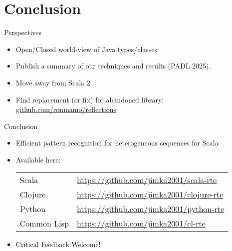 \section{Conclusion}


\begin{frame}{Perspectives}
  \begin{itemize}
  \item Open/Closed world-view of Java types/classes
  \item Publish a summary of our techniques and results (PADL 2025).
  \item Move away from Scala 2
  \item Find replacement (or fix) for abandoned library:   \url{github.com/ronmamo/reflections}
  \end{itemize}
\end{frame}

{
\begin{frame}{Conclusion}
  \begin{itemize}
  \item Efficient pattern recognition for heterogeneous sequences for Scala
  \item Available here:

    \bigskip
    
    \begin{tabular}{ll}
    Scala & \url{https://github.com/jimka2001/scala-rte}\\
    Clojure & \url{https://github.com/jimka2001/clojure-rte}\\
    Python & \url{https://github.com/jimka2001/python-rte}\\
    Common Lisp & \url{https://github.com/jimka2001/cl-rte}    
  \end{tabular}


    \bigskip
    
  \item Critical Feedback Welcome!

  \end{itemize}
\end{frame}

}
